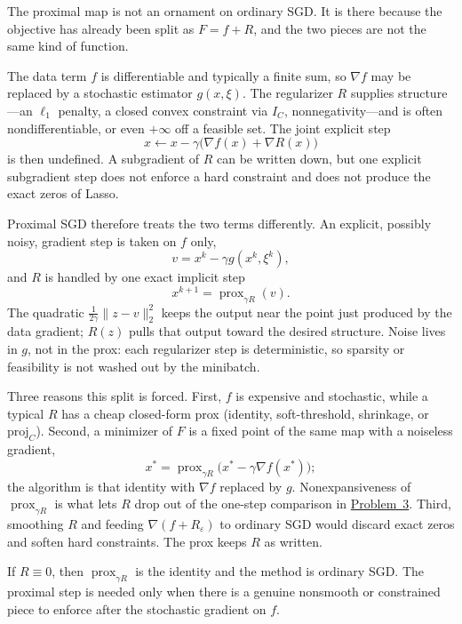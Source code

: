 \documentclass[11pt,a4paper]{article}
\DeclareMathOperator{\prox}{prox}
\newcommand{\jump}[2]{\hyperref[#1]{#2}}
\theoremstyle{definition}
\begin{document}
\begin{remark}\label{rem:prox-motivation}
The proximal map is not an ornament on ordinary SGD. It is there because the
objective has already been split as $F=f+R$, and the two pieces are not the same
kind of function.

The data term $f$ is differentiable and typically a finite sum, so $\nabla f$
may be replaced by a stochastic estimator $g(x,\xi)$. The regularizer $R$
supplies structure---an $\ell_1$ penalty, a closed convex constraint via $I_C$,
nonnegativity---and is often nondifferentiable, or even $+\infty$ off a feasible
set. The joint explicit step
\[
x\leftarrow x-\gamma\bigl(\nabla f(x)+\nabla R(x)\bigr)
\]
is then undefined. A subgradient of $R$ can be written down, but one explicit
subgradient step does not enforce a hard constraint and does not produce the
exact zeros of Lasso.

Proximal SGD therefore treats the two terms differently. An explicit,
possibly noisy, gradient step is taken on $f$ only,
\[
v=x^k-\gamma g(x^k,\xi^k),
\]
and $R$ is handled by one exact implicit step
\[
x^{k+1}=\prox_{\gamma R}(v).
\]
The quadratic \(\frac{1}{2\gamma}\|z-v\|_2^2\) keeps the output near the point
just produced by the data gradient; $R(z)$ pulls that output toward the
desired structure. Noise lives in $g$, not in the prox: each regularizer step
is deterministic, so sparsity or feasibility is not washed out by the minibatch.

Three reasons this split is forced. First, $f$ is expensive and stochastic, while
a typical $R$ has a cheap closed-form prox (identity, soft-threshold, shrinkage,
or $\mathrm{proj}_C$). Second, a minimizer of $F$ is a fixed point of the same
map with a noiseless gradient,
\[
x^*=\prox_{\gamma R}\bigl(x^*-\gamma\nabla f(x^*)\bigr);
\]
the algorithm is that identity with $\nabla f$ replaced by $g$.
Nonexpansiveness of $\prox_{\gamma R}$ is what lets $R$ drop out of the
one-step comparison in \jump{prob:spr2025-opt-3}{Problem~3}. Third, smoothing
$R$ and feeding $\nabla(f+R_{\varepsilon})$ to ordinary SGD would discard exact
zeros and soften hard constraints. The prox keeps $R$ as written.

If $R\equiv 0$, then $\prox_{\gamma R}$ is the identity and the method is
ordinary SGD. The proximal step is needed only when there is a genuine
nonsmooth or constrained piece to enforce after the stochastic gradient on $f$.
\end{remark}
\end{document}
